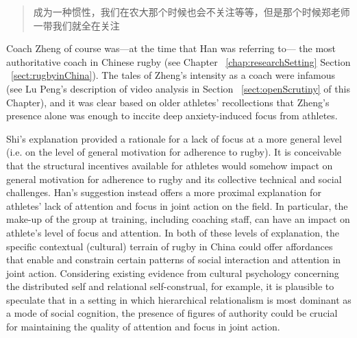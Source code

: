 \begin{CJK}{UTF8}{gbsn}
\begin{quotation}
    成为一种惯性，我们在农大那个时候也会不关注等等，但是那个时候郑老师一带我们就全在关注
\end{quotation}

Coach Zheng of course was---at the time that Han was referring to--- the most authoritative coach in Chinese rugby (see Chapter ~\ref{chap:researchSetting} Section ~\ref{sect:rugbyinChina}). The tales of Zheng's intensity as a coach were infamous (see Lu Peng's description of video analysis in Section ~\ref{sect:openScrutiny} of this Chapter), and it was clear based on older athletes' recollections that Zheng's presence alone was enough to inccite deep anxiety-induced focus from athletes.

Shi's explanation provided a rationale for a lack of focus at a more general level (i.e. on the level of general motivation for adherence to rugby). It is conceivable that the structural incentives available for athletes would somehow impact on general motivation for adherence to rugby and its collective technical and social challenges.  Han's suggestion instead offers a more proximal explanation for athletes' lack of attention and focus in joint action on the field. In particular, the make-up of the group at training, including coaching staff, can have an impact on athlete's level of focus and attention.
In both of these levels of explanation, the specific contextual (cultural) terrain of rugby in China could offer affordances that enable and constrain certain patterns of social interaction and attention in joint action.  Considering existing evidence from cultural psychology concerning the distributed self and relational self-construal, for example, it is plausible to speculate that in a setting in which hierarchical relationalism is most dominant as a mode of social cognition, the presence of figures of authority could be crucial for maintaining the quality of attention and focus in joint action.



\end{CJK}
